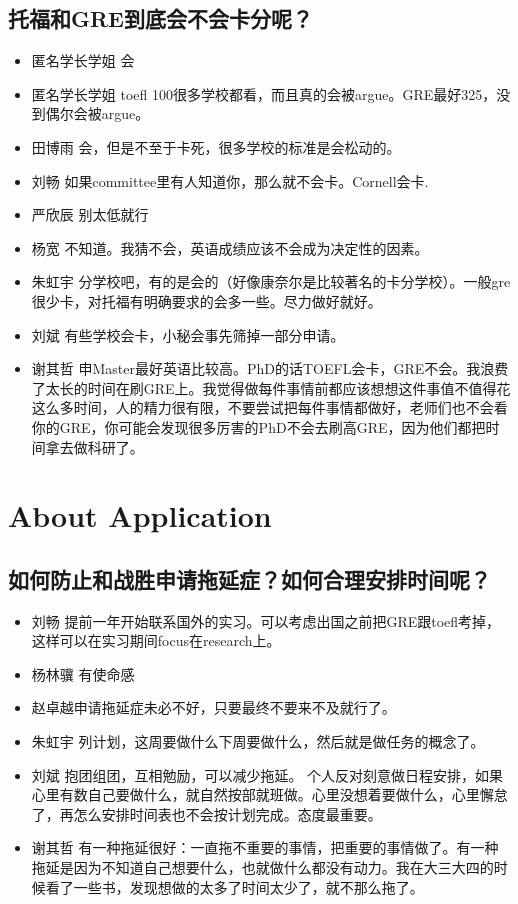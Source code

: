 \documentclass{vivid_layout}
\begin{document}
\subsection{托福和GRE到底会不会卡分呢？}
\begin{itemize}
\item  {\name 匿名学长学姐}  \quad 会
\item {\name 匿名学长学姐}  \quad  toefl 100很多学校都看，而且真的会被argue。GRE最好325，没到偶尔会被argue。
\item  { 田博雨}  \quad 会，但是不至于卡死，很多学校的标准是会松动的。
\item  { 刘畅}  \quad 如果committee里有人知道你，那么就不会卡。Cornell会卡.
\item  { 严欣辰}  \quad 别太低就行
\item  { 杨宽}  \quad 不知道。我猜不会，英语成绩应该不会成为决定性的因素。
\item  { 朱虹宇}  \quad 分学校吧，有的是会的（好像康奈尔是比较著名的卡分学校）。一般gre很少卡，对托福有明确要求的会多一些。尽力做好就好。
\item  { 刘斌}  \quad 有些学校会卡，小秘会事先筛掉一部分申请。
\item  { 谢其哲}  \quad 申Master最好英语比较高。PhD的话TOEFL会卡，GRE不会。我浪费了太长的时间在刷GRE上。我觉得做每件事情前都应该想想这件事值不值得花这么多时间，人的精力很有限，不要尝试把每件事情都做好，老师们也不会看你的GRE，你可能会发现很多厉害的PhD不会去刷高GRE，因为他们都把时间拿去做科研了。
\end{itemize}


\section{About Application}
\addtocounter{section}{1}
\setcounter{subsection}{0}

\subsection{如何防止和战胜申请拖延症？如何合理安排时间呢？}
\begin{itemize}
\item  { 刘畅}  \quad 提前一年开始联系国外的实习。可以考虑出国之前把GRE跟toefl考掉，这样可以在实习期间focus在research上。
\item  { 杨林骥}  \quad 有使命感
\item  { 赵卓越}申请拖延症未必不好，只要最终不要来不及就行了。
\item  { 朱虹宇}  \quad 列计划，这周要做什么下周要做什么，然后就是做任务的概念了。
\item  { 刘斌}  \quad 抱团组团，互相勉励，可以减少拖延。
    个人反对刻意做日程安排，如果心里有数自己要做什么，就自然按部就班做。心里没想着要做什么，心里懈怠了，再怎么安排时间表也不会按计划完成。态度最重要。
\item  { 谢其哲}  \quad 有一种拖延很好：一直拖不重要的事情，把重要的事情做了。有一种拖延是因为不知道自己想要什么，也就做什么都没有动力。我在大三大四的时候看了一些书，发现想做的太多了时间太少了，就不那么拖了。
\end{itemize}
\end{document}
